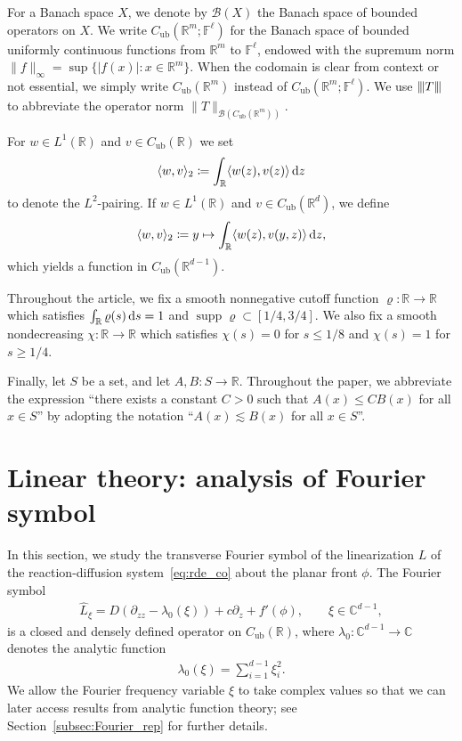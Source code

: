 \documentclass[12pt,oneside,a4paper,reqno]{amsart}
\numberwithin{equation}{section}
\theoremstyle{definition}
\theoremstyle{remark}
\newcommand{\bbC}{{\mathbb C}}
\newcommand{\bbR}{{\mathbb R}}
\newcommand{\rd}{{\,\rm{d}}}
\newcommand{\Cub}{{C_{\mathrm{ub}}}}
\DeclareMathOperator{\supp}{supp}
\DeclarePairedDelimiter{\tnorm}{\lvert\kern-0.25ex\lvert\kern-0.25ex\lvert}{\rvert\kern-0.25ex\rvert\kern-0.25ex\rvert}
\begin{document}
For a Banach space $X$, we denote by $\mathcal{B}(X)$ the Banach space of bounded operators on $X$. We write $\Cub(\bbR^m;\mathbb{F}^\ell)$ for the Banach space of bounded uniformly continuous functions from $\bbR^m$ to $\mathbb{F}^\ell$, endowed with the supremum norm $\|f\|_\infty = \sup\{|f(x)| : x \in \bbR^m\}$. When the codomain is clear from context or not essential, we simply write $\Cub(\bbR^m)$ instead of $\Cub(\bbR^m;\mathbb{F}^\ell)$. We use $\tnorm{T}$ to abbreviate the operator norm $\|T\|_{\mathcal{B}(\Cub(\bbR^m))}$.

For $w \in L^1(\bbR)$ and $v \in \Cub(\bbR)$ we set
\begin{align*}
    \langle w, v\rangle_2 \coloneq \int_{\bbR}\langle w(z),v(z)\rangle \rd z
\end{align*}
to denote the $L^2$-pairing. If $w \in L^1(\bbR)$ and $v \in \Cub(\bbR^d)$, we define
\begin{align*}
\langle w, v\rangle_2 \coloneq y \mapsto \int_{\bbR}\langle w(z),v(y,z)\rangle \rd z,
\end{align*}
which yields a function in $\Cub(\bbR^{d-1})$.

Throughout the article, we fix a smooth nonnegative cutoff function $\varrho \colon \bbR \to \bbR$ which satisfies $\int_{\bbR}\varrho(s)\rd s = 1$ and $\supp \varrho \subset [1/4,3/4]$. We also fix a smooth nondecreasing $\chi \colon \bbR \to \bbR$ which satisfies $\chi(s) = 0$ for $s \leq 1/8$ and $\chi(s) = 1$ for $s \geq 1/4$.

Finally, let $S$ be a set, and let $A, B \colon S \to \bbR$. Throughout the paper, we abbreviate the expression ``there exists a constant $C>0$ such that $A(x) \leq CB(x)$ for all $x \in S$'' by adopting the notation ``$A(x) \lesssim B(x)$ for all $x \in S$''.

\section{Linear theory: analysis of Fourier symbol}
\label{sec:spectral}

In this section, we study the transverse Fourier symbol of the linearization $L$ of the reaction-diffusion system~\eqref{eq:rde_co} about the planar front $\phi$. The Fourier symbol 
\begin{align*} 
\hat{L}_\xi = D \left(\partial_{zz} - \lambda_0(\xi)\right) + c \partial_z + f'(\phi), \qquad \xi \in \bbC^{d-1},
\end{align*}
is a closed and densely defined operator on $\Cub(\bbR)$, where $\lambda_0 \colon \bbC^{d-1} \to \bbC$ denotes the analytic function
\begin{align*}
\lambda_0(\xi) = \sum_{i = 1}^{d-1} \xi_i^2. 
\end{align*}
We allow the Fourier frequency variable $\xi$ to take complex values so that we can later access results from analytic function theory; see Section~\ref{subsec:Fourier_rep} for further details.
\end{document}
